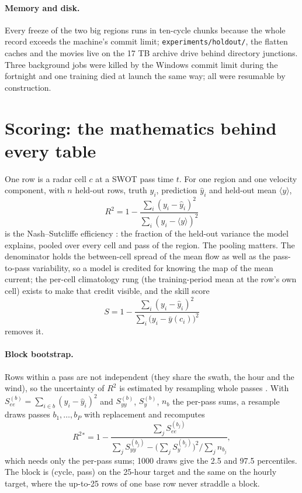 \documentclass[11pt]{article}
\newcommand{\R}{R^2}
\newcommand{\code}[1]{\texttt{#1}}
\begin{document}
\paragraph{Memory and disk.} Every freeze of the two big regions runs in ten-cycle chunks because the whole record exceeds the machine's commit limit; \code{experiments/holdout/}, the flatten caches and the movies live on the 17 TB archive drive behind directory junctions. Three background jobs were killed by the Windows commit limit during the fortnight and one training died at launch the same way; all were resumable by construction.

\section{Scoring: the mathematics behind every table}\label{sec:scoring}

One row is a radar cell $c$ at a SWOT pass time $t$. For one region and one velocity component, with $n$ held-out rows, truth $y_i$, prediction $\hat y_i$ and held-out mean $\langle y \rangle$,
\begin{equation}
\R = 1 - \frac{\sum_i (y_i - \hat y_i)^2}{\sum_i (y_i - \langle y\rangle)^2}
\label{eq:r2brief}
\end{equation}
is the Nash--Sutcliffe efficiency \citep{nash1970}: the fraction of the held-out variance the model explains, pooled over every cell and pass of the region. The pooling matters. The denominator holds the between-cell spread of the mean flow as well as the pass-to-pass variability, so a model is credited for knowing the map of the mean current; the per-cell climatology rung (the training-period mean at the row's own cell) exists to make that credit visible, and the skill score
\begin{equation}
S = 1 - \frac{\sum_i (y_i - \hat y_i)^2}{\sum_i \big(y_i - \bar y(c_i)\big)^2}
\end{equation}
removes it.

\paragraph{Block bootstrap.} Rows within a pass are not independent (they share the swath, the hour and the wind), so the uncertainty of $\R$ is estimated by resampling whole passes \citep{kunsch1989block}. With $S^{(b)}_{ee} = \sum_{i \in b}(y_i - \hat y_i)^2$ and $S^{(b)}_{yy}$, $S^{(b)}_y$, $n_b$ the per-pass sums, a resample draws passes $b_1, \dots, b_P$ with replacement and recomputes
\begin{equation}
\R{}^{*} = 1 - \frac{\sum_j S^{(b_j)}_{ee}}{\sum_j S^{(b_j)}_{yy} - \big(\sum_j S^{(b_j)}_{y}\big)^2 / \sum_j n_{b_j}},
\end{equation}
which needs only the per-pass sums; 1000 draws give the 2.5 and 97.5 percentiles. The block is (cycle, pass) on the 25-hour target and the same on the hourly target, where the up-to-25 rows of one base row never straddle a block.
\end{document}
